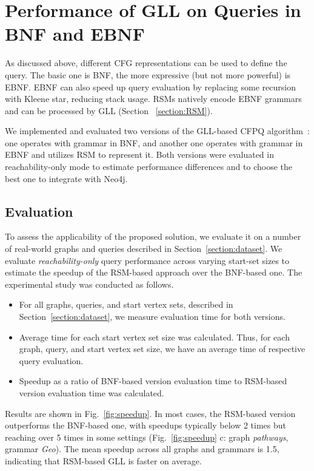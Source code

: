\documentclass[
11pt,%
tightenlines,%
twoside,%
onecolumn,%
nobibnotes,%
nofootinbib,%
superscriptaddress,%
noshowpacs,%
longbibliography,%
centertags]%
{revtex4-2}
\begin{document}
\section{Performance of GLL on Queries in BNF and EBNF}\label{section:BFN_or_RSM}

As discussed above, different CFG representations can be used to define the query. The basic one is BNF, the more expressive (but not more powerful) is EBNF. EBNF can also speed up query evaluation by replacing some recursion with Kleene star, reducing stack usage.
RSMs natively encode EBNF grammars and can be processed by GLL (Section ~\ref{section:RSM}).

We implemented and evaluated two versions of the GLL-based CFPQ algorithm~\cite{kotgll}: one operates with grammar in BNF, and another one operates with grammar in EBNF and utilizes RSM to represent it. Both versions were evaluated in reachability-only mode to estimate performance differences and to choose the best one to integrate with Neo4j. 

\subsection{Evaluation}\label{section:cfg_vs_rsm}

To assess the applicability of the proposed solution, we evaluate it on a number of real-world graphs and queries described in Section~\ref{section:dataset}.
We evaluate \textit{reachability-only} query performance across varying start-set sizes to estimate the speedup of the RSM-based approach over the BNF-based one.
The experimental study was conducted as follows.   

\begin{itemize}
    \item For all graphs, queries, and start vertex sets, described in Section~\ref{section:dataset}, we measure evaluation time for both versions.
    \item Average time for each start vertex set size was calculated. Thus, for each graph, query, and start vertex set size, we have an average time of respective query evaluation.
    \item Speedup as a ratio of BNF-based version evaluation time to RSM-based version evaluation time was calculated.
\end{itemize}


Results are shown in Fig.~\ref{fig:speedup}. In most cases, the RSM-based version outperforms the BNF-based one, with speedups typically below 2 times but reaching over 5 times in some settings (Fig.~\ref{fig:speedup} c: graph \textit{pathways}, grammar \textit{Geo}). The mean speedup across all graphs and grammars is 1.5, indicating that RSM-based GLL is faster on average.
\end{document}
